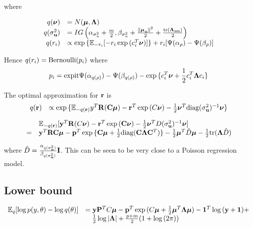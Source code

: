 \documentclass{amsart}[12pt]
\begin{document}
where

$$
\begin{array}{rl}
q({\boldsymbol \nu}) &= N({\boldsymbol \mu}, {\boldsymbol \Lambda}) \\
q(\sigma_{{\bf u}}^2) &= IG\left(\alpha_{\sigma_u^2} + \frac{m}{2}, \beta_{\sigma_u^2} + \frac{\|{\boldsymbol \mu}_{\bf u}\|^2}{2} + \frac{\text{tr}({\boldsymbol \Lambda}_{{\bf u}{\bf u}})}{2}\right) \\
q(r_i) &\propto \exp{\{{\mathbb E}_{-r_i} [-r_i \exp{(c_i^T{\boldsymbol\nu})}]\} + r_i [\Psi(\alpha_\rho) - \Psi(\beta_\rho)]} \\
\end{array}
$$

Hence $q(r_i) = \text{Bernoulli} (p_i)$ where
$$
p_i = \text{expit} \Psi{(\alpha_{q(\rho)})} - \Psi{(\beta_{q(\rho)})} - \exp{\{c_i^T{\boldsymbol\nu}+ {\frac{1}{2}}c_i^T {\boldsymbol\Lambda}c_i\}}
$$

The optimal approximation for ${\bf r}$ is
$$
\begin{array}{ll}
q({\bf r}) &\propto \exp{\{{\mathbb E}_{-q({\bf r})}y^T{\bf R}({\bf C}{\boldsymbol\mu}) - {\bf r}^T\exp{(C{\boldsymbol\nu})}-{\frac{1}{2}}{\boldsymbol\nu}^T \text{diag}(\sigma_{{\bf u}}^2)^{-1} {\boldsymbol\nu}\}}
\end{array}
$$

$$
\begin{array}{ll}
&{\mathbb E}_{-q({\bf r})} [{\bf y}^T{\bf R}(C{\boldsymbol \nu}) - {\bf r}^T\exp{({\bf C}{\boldsymbol\nu})}-{\frac{1}{2}} {\boldsymbol \nu}^T D(\sigma_{{\bf u}}^2)^{-1} {\boldsymbol \nu}]\\
=&{\bf y}^T{\bf R}{\bf C} {\boldsymbol \mu} - {\bf p}^T \exp{\{{\bf C}{\boldsymbol\mu}+ {\frac{1}{2}}\text{diag}({\bf C}{\boldsymbol\Lambda}{\bf C}^T)\}} - {\frac{1}{2}} {\boldsymbol \mu}^T \hat{D} {\boldsymbol \mu} - {\frac{1}{2}} \text{tr}({\boldsymbol \Lambda} \hat{D})
\end{array}
$$

where $\hat{D} = \frac{\alpha_{q(\sigma_{{\bf u}}^2)}}{\beta_{q(\sigma_{{\bf u}}^2)}} {\bf I}$. This can be seen to be very close to a Poisson
regression model.

\subsection{Lower bound}
$$
\begin{array}{ll}
{\mathbb E}_q [\log{p(y, \theta)} - \log{q(\theta)}] &= 
{\bf y} {\bf P}^T C {\boldsymbol \mu} - {\bf p}^T\exp{(C{\boldsymbol\mu}+ {\frac{1}{2}}{\boldsymbol\mu}^T {\boldsymbol\Lambda}{\boldsymbol\mu})} - {\bf 1}^T\log{({\bf y}+ {\bf1})} + \\
&\quad {\frac{1}{2}} \log{|{\boldsymbol\Lambda}|} + \frac{p + m}{2} (1 + \log{(2 \pi)})
\end{array}
$$
\end{document}

